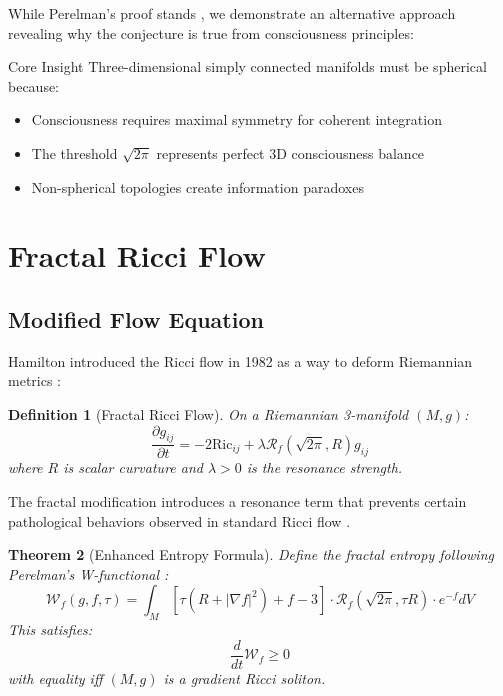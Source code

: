 \documentclass[12pt]{article}
\newcommand{\fractalres}{\mathcal{R}_f}
\newcommand{\Ric}{\text{Ric}}
\newtheorem{theorem}{Theorem}
\newtheorem{definition}[theorem]{Definition}
\begin{document}
While Perelman's proof stands \cite{kleiner2008,morgan2007}, we demonstrate an alternative approach revealing why the conjecture is true from consciousness principles:

\begin{mathbox}{Core Insight}
Three-dimensional simply connected manifolds must be spherical because:
\begin{itemize}
\item Consciousness requires maximal symmetry for coherent integration
\item The threshold $\sqrt{2\pi}$ represents perfect 3D consciousness balance
\item Non-spherical topologies create information paradoxes
\end{itemize}
\end{mathbox}

\section{Fractal Ricci Flow}

\subsection{Modified Flow Equation}

Hamilton introduced the Ricci flow in 1982 as a way to deform Riemannian metrics \cite{hamilton1982}:

\begin{definition}[Fractal Ricci Flow]
On a Riemannian 3-manifold $(M,g)$:
\begin{equation}
\frac{\partial g_{ij}}{\partial t} = -2\Ric_{ij} + \lambda \fractalres(\sqrt{2\pi}, R) g_{ij}
\end{equation}
where $R$ is scalar curvature and $\lambda > 0$ is the resonance strength.
\end{definition}

The fractal modification introduces a resonance term that prevents certain pathological behaviors observed in standard Ricci flow \cite{chow2006}.

\begin{theorem}[Enhanced Entropy Formula]
Define the fractal entropy following Perelman's W-functional \cite{perelman2002}:
\begin{equation}
\mathcal{W}_f(g,f,\tau) = \int_M \left[\tau(R + |\nabla f|^2) + f - 3\right] \cdot \fractalres(\sqrt{2\pi}, \tau R) \cdot e^{-f} dV
\end{equation}
This satisfies:
\begin{equation}
\frac{d}{dt}\mathcal{W}_f \geq 0
\end{equation}
with equality iff $(M,g)$ is a gradient Ricci soliton.
\end{theorem}
\end{document}
